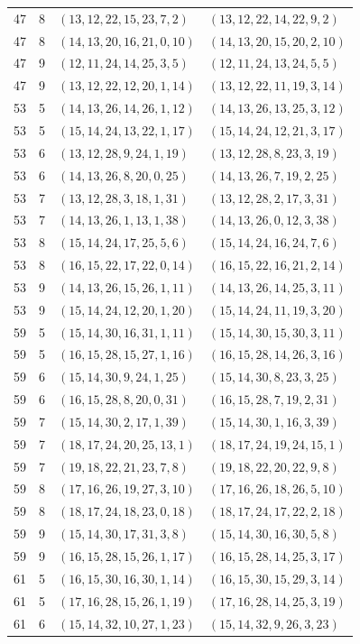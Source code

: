 \documentclass[11pt,a4paper]{article}
\theoremstyle{definition}
\numberwithin{equation}{section}
\begin{document}
\begin{longtable}{rrll}
47&8&$(13,12,22,15,23,7,2)$&$(13,12,22,14,22,9,2)$\\
47&8&$(14,13,20,16,21,0,10)$&$(14,13,20,15,20,2,10)$\\
47&9&$(12,11,24,14,25,3,5)$&$(12,11,24,13,24,5,5)$\\
47&9&$(13,12,22,12,20,1,14)$&$(13,12,22,11,19,3,14)$\\
53&5&$(14,13,26,14,26,1,12)$&$(14,13,26,13,25,3,12)$\\
53&5&$(15,14,24,13,22,1,17)$&$(15,14,24,12,21,3,17)$\\
53&6&$(13,12,28,9,24,1,19)$&$(13,12,28,8,23,3,19)$\\
53&6&$(14,13,26,8,20,0,25)$&$(14,13,26,7,19,2,25)$\\
53&7&$(13,12,28,3,18,1,31)$&$(13,12,28,2,17,3,31)$\\
53&7&$(14,13,26,1,13,1,38)$&$(14,13,26,0,12,3,38)$\\
53&8&$(15,14,24,17,25,5,6)$&$(15,14,24,16,24,7,6)$\\
53&8&$(16,15,22,17,22,0,14)$&$(16,15,22,16,21,2,14)$\\
53&9&$(14,13,26,15,26,1,11)$&$(14,13,26,14,25,3,11)$\\
53&9&$(15,14,24,12,20,1,20)$&$(15,14,24,11,19,3,20)$\\
59&5&$(15,14,30,16,31,1,11)$&$(15,14,30,15,30,3,11)$\\
59&5&$(16,15,28,15,27,1,16)$&$(16,15,28,14,26,3,16)$\\
59&6&$(15,14,30,9,24,1,25)$&$(15,14,30,8,23,3,25)$\\
59&6&$(16,15,28,8,20,0,31)$&$(16,15,28,7,19,2,31)$\\
59&7&$(15,14,30,2,17,1,39)$&$(15,14,30,1,16,3,39)$\\
59&7&$(18,17,24,20,25,13,1)$&$(18,17,24,19,24,15,1)$\\
59&7&$(19,18,22,21,23,7,8)$&$(19,18,22,20,22,9,8)$\\
59&8&$(17,16,26,19,27,3,10)$&$(17,16,26,18,26,5,10)$\\
59&8&$(18,17,24,18,23,0,18)$&$(18,17,24,17,22,2,18)$\\
59&9&$(15,14,30,17,31,3,8)$&$(15,14,30,16,30,5,8)$\\
59&9&$(16,15,28,15,26,1,17)$&$(16,15,28,14,25,3,17)$\\
61&5&$(16,15,30,16,30,1,14)$&$(16,15,30,15,29,3,14)$\\
61&5&$(17,16,28,15,26,1,19)$&$(17,16,28,14,25,3,19)$\\
61&6&$(15,14,32,10,27,1,23)$&$(15,14,32,9,26,3,23)$\\

\end{longtable}
\end{document}
